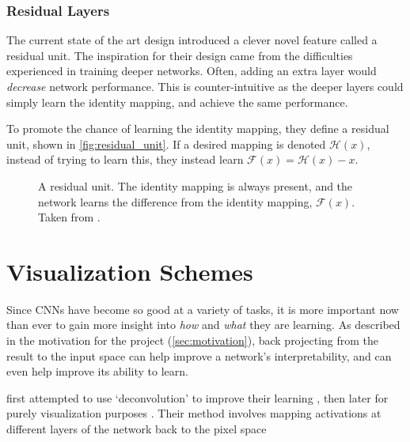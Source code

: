\subsubsection{Residual Layers}
  The current state of the art design introduced a clever novel feature called
  a residual unit\citep{he_deep_2015,he_identity_2016}. The inspiration for their design came from the difficulties
  experienced in training deeper networks. Often, adding an extra layer would
  \emph{decrease} network performance. This is counter-intuitive as the deeper
  layers could simply learn the identity mapping, and achieve the same
  performance.

  To promote the chance of learning the identity mapping, they define
  a residual unit, shown in \autoref{fig:residual_unit}. If a desired mapping
  is denoted $\mathcal{H}(x)$, instead of trying to learn this, they instead
  learn $\mathcal{F}(x) = \mathcal{H}(x) - x$. 
  \begin{figure}
    \centering
    \caption[The residual unit from ResNet]
          {A residual unit. The identity mapping is always present, and the
            network learns the difference from the identity mapping, $\mathcal{F}(x)$.
            Taken from \citep{he_deep_2015}.}
      \label{fig:residual_unit}
  \end{figure}

\section{Visualization Schemes}\label{sec:visualization_schemes}
  Since CNNs have become so good at a variety of tasks, it is more important
  now than ever to gain more insight into \emph{how} and \emph{what} they are
  learning. As described in the motivation for the project
  (\autoref{sec:motivation}), back projecting from the result to the input space
  can help improve a network's interpretability, and can even help improve its
  ability to learn. 

  \citeauthor{zeiler_adaptive_2011} first attempted to use `deconvolution' to
  improve their learning \citep{zeiler_adaptive_2011}, then later for purely
  visualization purposes \citep{zeiler_visualizing_compact_2014}. Their method
  involves mapping activations at different layers of the network back to the pixel
  space
  
